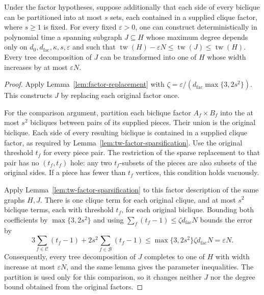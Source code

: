 \begin{theorem}
\label{thm:tw-sparsification}
Under the factor hypotheses, suppose additionally that each side
of every biclique can be partitioned into at most $s$ sets, each
contained in a supplied clique factor, where $s\ge1$ is fixed.
For every fixed $\varepsilon>0$, one can construct deterministically
in polynomial time a spanning subgraph $J\subseteq H$ whose maximum
degree depends only on $d_0,d_{\mathrm{fac}},\kappa,s,\varepsilon$ and such that
$\operatorname{tw}(H)-\varepsilon N
 \le\operatorname{tw}(J)\le\operatorname{tw}(H)$.
Every tree decomposition of $J$ can be transformed into one of
$H$ whose width increases by at most $\varepsilon N$.
\end{theorem}

\begin{proof}
Apply Lemma~\ref{lem:factor-replacement} with
$\zeta=\varepsilon/(d_{\mathrm{fac}}\max\{3,2s^2\})$. This constructs $J$ by replacing
each original factor once.

For the comparison argument, partition each biclique factor
$A_f\times B_f$ into the at most $s^2$ bicliques between pairs
of its supplied pieces. Their union is the original biclique.
Each side of every resulting biclique is contained in a supplied
clique factor, as required by
Lemma~\ref{lem:tw-factor-sparsification}. Use the original
threshold $t_f$ for every piece pair. The restriction of the sparse
replacement to that pair has no $(t_f,t_f)$ hole: any two
$t_f$-subsets of the pieces are also subsets of the original sides.
If a piece has fewer than $t_f$ vertices, this condition holds
vacuously.

Apply Lemma~\ref{lem:tw-factor-sparsification} to this factor
description of the same graphs $H,J$. There is one clique term
for each original clique, and at most $s^2$ biclique terms, each
with threshold $t_f$, for each original biclique. Bounding both
coefficients by $\max\{3,2s^2\}$ and using
$\sum_f(t_f-1)\le\zeta d_{\mathrm{fac}}N$ bounds the error by
\[
 3\sum_{f\in\mathcal C}(t_f-1)
       +2s^2\sum_{f\in\mathcal B}(t_f-1)
 \le\max\{3,2s^2\}\zeta d_{\mathrm{fac}}N=\varepsilon N.
\]
Consequently, every tree decomposition of $J$ completes to one
of $H$ with width increase at most $\varepsilon N$, and the
same lemma gives the parameter inequalities. The partition is used
only for this comparison, so it changes neither $J$ nor the degree
bound obtained from the original factors.
\end{proof}

